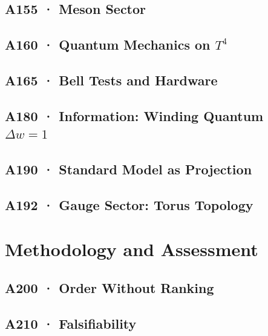 \documentclass[11pt,twoside,openright]{book}
\begin{document}
\chapter[A155 · Meson Sector]{A155 · Meson Sector}


\chapter[A160 · Quantum Mechanics on $T^4$]{A160 · Quantum Mechanics on $T^4$}


\chapter[A165 · Bell Tests and Hardware]{A165 · Bell Tests and Hardware}


\chapter[A180 · Information]{A180 · Information: Winding Quantum $\Delta w=1$}


\chapter[A190 · Standard Model as Projection]{A190 · Standard Model as Projection}


\chapter[A192 · Gauge Sector]{A192 · Gauge Sector: Torus Topology}


\part{Methodology and Assessment}

\chapter[A200 · Order Without Ranking]{A200 · Order Without Ranking}


\chapter[A210 · Falsifiability]{A210 · Falsifiability}

\end{document}
